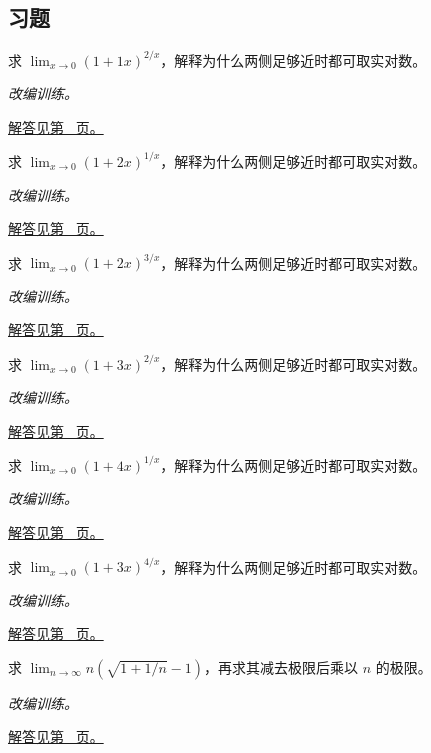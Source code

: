\documentclass[12pt,fontset=fandol]{ctexart}
\begin{document}
\subsection{习题}
\begin{example}[幂指型函数极限]\label{ex:c5q1}
求 $\displaystyle\lim_{x\to0}(1+1x)^{2/x}$，解释为什么两侧足够近时都可取实对数。
\par\textit{改编训练。}\par\hyperref[ans:c5q1]{解答见第~\pageref{ans:c5q1} 页。}
\end{example}
\begin{example}[幂指型函数极限]\label{ex:c5q2}
求 $\displaystyle\lim_{x\to0}(1+2x)^{1/x}$，解释为什么两侧足够近时都可取实对数。
\par\textit{改编训练。}\par\hyperref[ans:c5q2]{解答见第~\pageref{ans:c5q2} 页。}
\end{example}
\begin{example}[幂指型函数极限]\label{ex:c5q3}
求 $\displaystyle\lim_{x\to0}(1+2x)^{3/x}$，解释为什么两侧足够近时都可取实对数。
\par\textit{改编训练。}\par\hyperref[ans:c5q3]{解答见第~\pageref{ans:c5q3} 页。}
\end{example}
\begin{example}[幂指型函数极限]\label{ex:c5q4}
求 $\displaystyle\lim_{x\to0}(1+3x)^{2/x}$，解释为什么两侧足够近时都可取实对数。
\par\textit{改编训练。}\par\hyperref[ans:c5q4]{解答见第~\pageref{ans:c5q4} 页。}
\end{example}
\begin{example}[幂指型函数极限]\label{ex:c5q5}
求 $\displaystyle\lim_{x\to0}(1+4x)^{1/x}$，解释为什么两侧足够近时都可取实对数。
\par\textit{改编训练。}\par\hyperref[ans:c5q5]{解答见第~\pageref{ans:c5q5} 页。}
\end{example}
\begin{example}[幂指型函数极限]\label{ex:c5q6}
求 $\displaystyle\lim_{x\to0}(1+3x)^{4/x}$，解释为什么两侧足够近时都可取实对数。
\par\textit{改编训练。}\par\hyperref[ans:c5q6]{解答见第~\pageref{ans:c5q6} 页。}
\end{example}
\begin{example}[缩放后的根式增量]\label{ex:c5q7}
求 $\displaystyle\lim_{n\to\infty}n\left(\sqrt{1+1/n}-1\right)$，再求其减去极限后乘以 $n$ 的极限。
\par\textit{改编训练。}\par\hyperref[ans:c5q7]{解答见第~\pageref{ans:c5q7} 页。}
\end{example}
\end{document}
